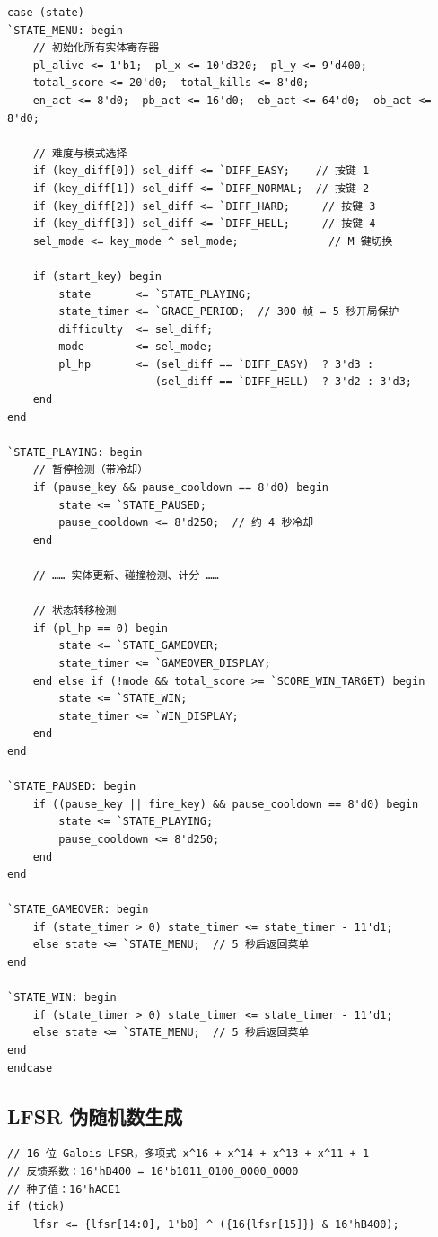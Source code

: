 \documentclass[12pt,a4paper]{ctexart}
\begin{document}
\begin{lstlisting}
case (state)
`STATE_MENU: begin
    // 初始化所有实体寄存器
    pl_alive <= 1'b1;  pl_x <= 10'd320;  pl_y <= 9'd400;
    total_score <= 20'd0;  total_kills <= 8'd0;
    en_act <= 8'd0;  pb_act <= 16'd0;  eb_act <= 64'd0;  ob_act <= 8'd0;

    // 难度与模式选择
    if (key_diff[0]) sel_diff <= `DIFF_EASY;    // 按键 1
    if (key_diff[1]) sel_diff <= `DIFF_NORMAL;  // 按键 2
    if (key_diff[2]) sel_diff <= `DIFF_HARD;     // 按键 3
    if (key_diff[3]) sel_diff <= `DIFF_HELL;     // 按键 4
    sel_mode <= key_mode ^ sel_mode;              // M 键切换

    if (start_key) begin
        state       <= `STATE_PLAYING;
        state_timer <= `GRACE_PERIOD;  // 300 帧 = 5 秒开局保护
        difficulty  <= sel_diff;
        mode        <= sel_mode;
        pl_hp       <= (sel_diff == `DIFF_EASY)  ? 3'd3 :
                       (sel_diff == `DIFF_HELL)  ? 3'd2 : 3'd3;
    end
end

`STATE_PLAYING: begin
    // 暂停检测（带冷却）
    if (pause_key && pause_cooldown == 8'd0) begin
        state <= `STATE_PAUSED;
        pause_cooldown <= 8'd250;  // 约 4 秒冷却
    end

    // …… 实体更新、碰撞检测、计分 ……

    // 状态转移检测
    if (pl_hp == 0) begin
        state <= `STATE_GAMEOVER;
        state_timer <= `GAMEOVER_DISPLAY;
    end else if (!mode && total_score >= `SCORE_WIN_TARGET) begin
        state <= `STATE_WIN;
        state_timer <= `WIN_DISPLAY;
    end
end

`STATE_PAUSED: begin
    if ((pause_key || fire_key) && pause_cooldown == 8'd0) begin
        state <= `STATE_PLAYING;
        pause_cooldown <= 8'd250;
    end
end

`STATE_GAMEOVER: begin
    if (state_timer > 0) state_timer <= state_timer - 11'd1;
    else state <= `STATE_MENU;  // 5 秒后返回菜单
end

`STATE_WIN: begin
    if (state_timer > 0) state_timer <= state_timer - 11'd1;
    else state <= `STATE_MENU;  // 5 秒后返回菜单
end
endcase
\end{lstlisting}

\subsection{LFSR 伪随机数生成}

\begin{lstlisting}
// 16 位 Galois LFSR，多项式 x^16 + x^14 + x^13 + x^11 + 1
// 反馈系数：16'hB400 = 16'b1011_0100_0000_0000
// 种子值：16'hACE1
if (tick)
    lfsr <= {lfsr[14:0], 1'b0} ^ ({16{lfsr[15]}} & 16'hB400);
\end{lstlisting}
\end{document}
